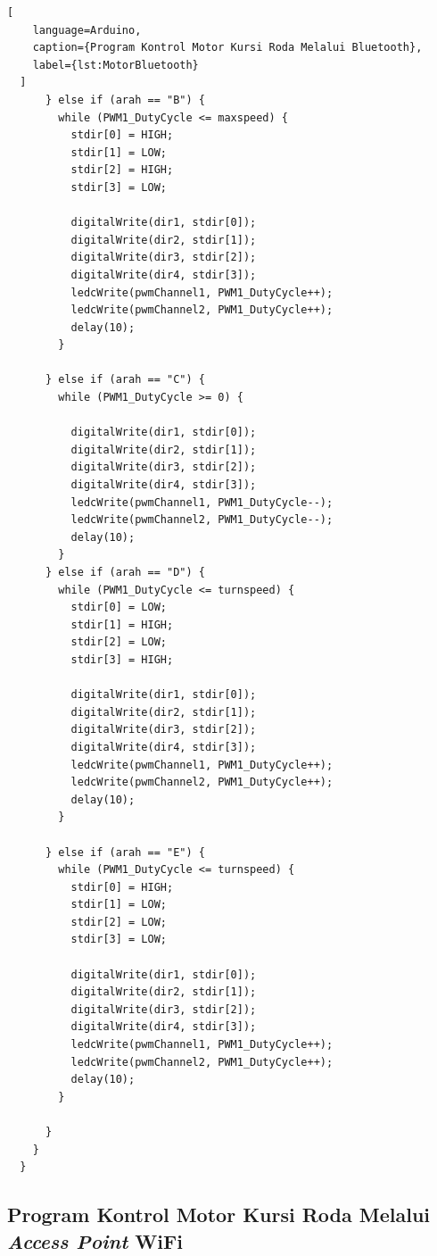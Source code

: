\begin{lstlisting}[
    language=Arduino,
    caption={Program Kontrol Motor Kursi Roda Melalui Bluetooth},
    label={lst:MotorBluetooth}
  ]
      } else if (arah == "B") {
        while (PWM1_DutyCycle <= maxspeed) {
          stdir[0] = HIGH;
          stdir[1] = LOW;
          stdir[2] = HIGH;
          stdir[3] = LOW;
  
          digitalWrite(dir1, stdir[0]);
          digitalWrite(dir2, stdir[1]);
          digitalWrite(dir3, stdir[2]);
          digitalWrite(dir4, stdir[3]);
          ledcWrite(pwmChannel1, PWM1_DutyCycle++);
          ledcWrite(pwmChannel2, PWM1_DutyCycle++);
          delay(10);
        }
  
      } else if (arah == "C") {
        while (PWM1_DutyCycle >= 0) {
  
          digitalWrite(dir1, stdir[0]);
          digitalWrite(dir2, stdir[1]);
          digitalWrite(dir3, stdir[2]);
          digitalWrite(dir4, stdir[3]);
          ledcWrite(pwmChannel1, PWM1_DutyCycle--);
          ledcWrite(pwmChannel2, PWM1_DutyCycle--);
          delay(10);
        }
      } else if (arah == "D") {
        while (PWM1_DutyCycle <= turnspeed) {
          stdir[0] = LOW;
          stdir[1] = HIGH;
          stdir[2] = LOW;
          stdir[3] = HIGH;
  
          digitalWrite(dir1, stdir[0]);
          digitalWrite(dir2, stdir[1]);
          digitalWrite(dir3, stdir[2]);
          digitalWrite(dir4, stdir[3]);
          ledcWrite(pwmChannel1, PWM1_DutyCycle++);
          ledcWrite(pwmChannel2, PWM1_DutyCycle++);
          delay(10);
        }
  
      } else if (arah == "E") {
        while (PWM1_DutyCycle <= turnspeed) {
          stdir[0] = HIGH;
          stdir[1] = LOW;
          stdir[2] = LOW;
          stdir[3] = LOW;
  
          digitalWrite(dir1, stdir[0]);
          digitalWrite(dir2, stdir[1]);
          digitalWrite(dir3, stdir[2]);
          digitalWrite(dir4, stdir[3]);
          ledcWrite(pwmChannel1, PWM1_DutyCycle++);
          ledcWrite(pwmChannel2, PWM1_DutyCycle++);
          delay(10);
        }
  
      }
    }
  }  
  \end{lstlisting}

\subsection*{Program Kontrol Motor Kursi Roda Melalui \emph{Access Point} WiFi}


